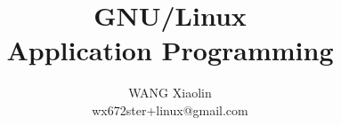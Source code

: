 \usepackage{wx672tut}




\newcommand{\textbooks}{\nocite{cs241, matthew2008beginning, cooper10bash, raymond2003art,
    stevens2013advanced, love:2007:lsp:1205435, kerrisk:2010:lpi:1869911,
    bryant2010computersystems}}%



\title{GNU/Linux\\Application Programming}
\author{WANG Xiaolin\\%
  {\footnotesize\ttfamily wx672ster+linux@gmail.com}}


